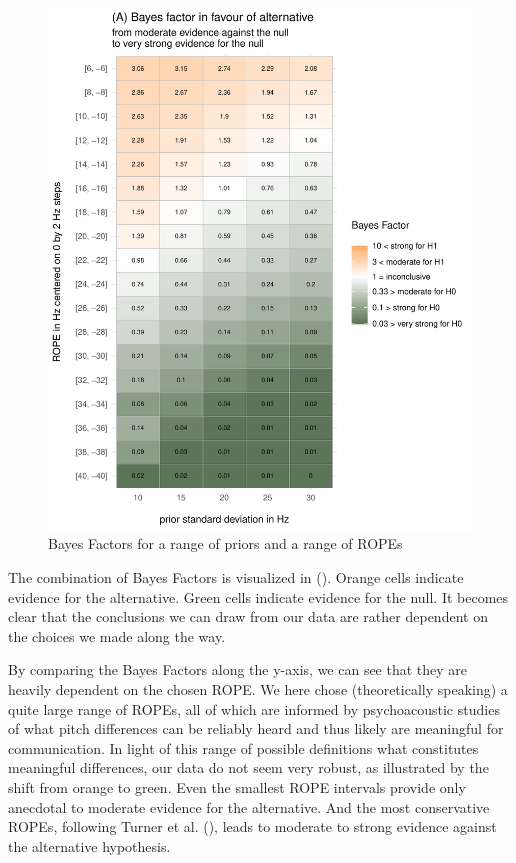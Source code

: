 \documentclass[
  doc,
  floatsintext,
  longtable,
  nolmodern,
  notxfonts,
  notimes,
  colorlinks=true,linkcolor=blue,citecolor=blue,urlcolor=blue]{apa7}
\begin{document}
\begin{figure}[!tbp]

\caption{Bayes Factors for a range of priors and a range of ROPEs}

{\centering \includegraphics{manuscript_files/figure-pdf/visualize-raster-1.pdf}

}

\end{figure}%

The combination of Bayes Factors is visualized in
().
Orange cells indicate evidence for the alternative. Green cells indicate
evidence for the null. It becomes clear that the conclusions we can draw
from our data are rather dependent on the choices we made along the way.

By comparing the Bayes Factors along the y-axis, we can see that they
are heavily dependent on the chosen ROPE. We here chose (theoretically
speaking) a quite large range of ROPEs, all of which are informed by
psychoacoustic studies of what pitch differences can be reliably heard
and thus likely are meaningful for communication. In light of this range
of possible definitions what constitutes meaningful differences, our
data do not seem very robust, as illustrated by the shift from orange to
green. Even the smallest ROPE intervals provide only anecdotal to
moderate evidence for the alternative. And the most conservative ROPEs,
following Turner et al. (),
leads to moderate to strong evidence against the alternative hypothesis.
\end{document}
